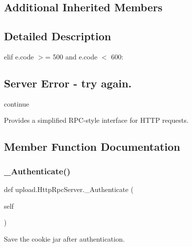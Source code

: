 \subsection*{Additional Inherited Members}


\subsection{Detailed Description}
elif e.\+code $>$= 500 and e.\+code $<$ 600\+: \subsection*{Server Error -\/ try again.}

continue \begin{DoxyVerb}Provides a simplified RPC-style interface for HTTP requests.\end{DoxyVerb}
 

\subsection{Member Function Documentation}
\mbox{\label{classupload_1_1_http_rpc_server_ab46a30c5aaa9f4d8f5a4bcb32293010e}} 
\subsubsection{\texorpdfstring{\+\_\+\+Authenticate()}{\_Authenticate()}}
{\footnotesize\ttfamily def upload.\+Http\+Rpc\+Server.\+\_\+\+Authenticate (\begin{DoxyParamCaption}\item[{}]{self }\end{DoxyParamCaption})\hspace{0.3cm}{\ttfamily [private]}}

\begin{DoxyVerb}Save the cookie jar after authentication.\end{DoxyVerb}
 \mbox{\label{classupload_1_1_http_rpc_server_a4685030df704ec17f020c8790108a05a}} 
